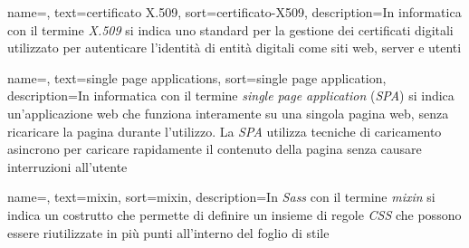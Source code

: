  {
    name=,
    text=certificato X.509,
    sort=certificato-X509,
    description={In informatica con il termine \emph{X.509} si indica uno standard per la gestione dei certificati digitali utilizzato per autenticare l'identità di entità digitali come siti web, server e utenti}
}


 {
    name=,
    text=single page applications,
    sort=single page application,
    description={In informatica con il termine \emph{single page application} (\emph{SPA}) si indica un'applicazione web che funziona interamente su una singola pagina web, senza ricaricare la pagina durante l'utilizzo. La \emph{SPA} utilizza tecniche di caricamento asincrono per caricare rapidamente il contenuto della pagina senza causare interruzioni all'utente} 
}


 {
    name=,
    text=mixin,
    sort=mixin,
    description={In \emph{Sass} con il termine \emph{mixin} si indica un costrutto che permette di definire un insieme di regole \emph{CSS} che possono essere riutilizzate in più punti all'interno del foglio di stile}
}